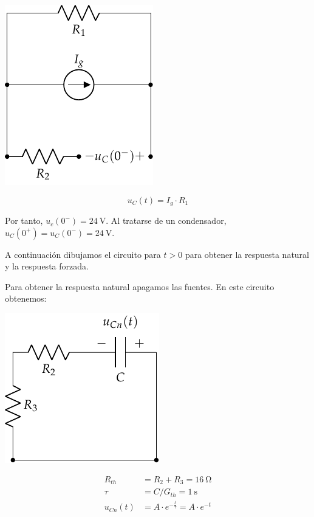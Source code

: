 \vspace{3mm}
\begin{minipage}{0.3\textwidth}
  \includegraphics{figuras/FM_4_3_t0-}
\end{minipage}
\begin{minipage}{0.7\textwidth}
  \begin{equation*}
    u_C(t) = I_g \cdot R_1 
  \end{equation*}
\end{minipage}

\vspace{2mm}
Por tanto, $u_c(0^-) = \SI{24}{\volt}$. Al tratarse de un condensador,
$u_C(0^+) = u_C(0^-) = \SI{24}{\volt}$.

\vspace{3mm}
A continuación dibujamos el circuito para $t > 0$ para obtener la
respuesta natural y la respuesta forzada.

\vspace{3mm}
Para obtener la respuesta natural apagamos las fuentes. En este
circuito obtenemos:

\vspace{2mm}
\begin{minipage}{0.3\textwidth}
  \includegraphics{figuras/FM_4_3_natural}
\end{minipage}
\begin{minipage}{0.7\textwidth}
  \begin{align*}
    R_{th} &= R_2 + R_3 = \SI{16}{\ohm}\\
    \tau &= C/G_{th} = \SI{1}{\second}\\
    u_{Cn}(t) &= A \cdot e^{-\frac{t}{\tau}} = A \cdot e^{-t}
  \end{align*}
\end{minipage}

